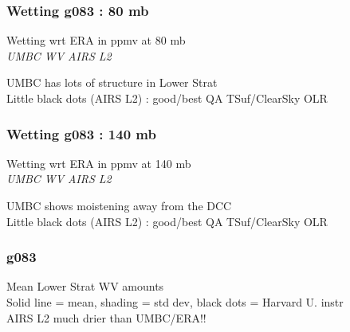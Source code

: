 \documentclass[10pt,t]{beamer}
\begin{document}
\begin{frame}
\frametitle{Wetting g083 : 80 mb}
Wetting wrt ERA in ppmv at 80 mb\\
\hspace{0.5in} \emph{UMBC WV}  \hspace{2.0in} \emph{AIRS L2} \\
\begin{center}
\end{center}
UMBC has lots of structure in Lower Strat \\
Little black dots (AIRS L2) : good/best QA TSuf/ClearSky OLR
\end{frame}

\begin{frame}
\frametitle{Wetting g083 : 140 mb}
Wetting wrt ERA in ppmv at 140 mb\\
\hspace{0.5in} \emph{UMBC WV}  \hspace{2.0in} \emph{AIRS L2} \\
\begin{center}
\end{center}
UMBC shows moistening away from the DCC \\
Little black dots (AIRS L2) : good/best QA TSuf/ClearSky OLR
\end{frame}

\begin{frame}
\frametitle{g083}
Mean Lower Strat WV amounts \\
Solid line = mean, shading = std dev, black dots = Harvard U. instr\\
AIRS L2 much drier than UMBC/ERA!!
\end{frame}
\end{document}
